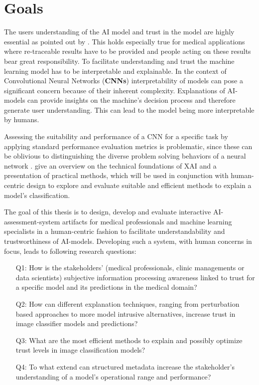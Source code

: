 \documentclass[11pt,a4paper,english]{scrreprt}
\begin{document}
\section{Goals}
The users understanding of the AI model and trust in the model are highly essential as pointed out by \textcite{knapic_explainable_2021}. This holds especially true for medical applications where re-traceable results have to be provided and people acting on these results bear great responsibility. To facilitate understanding and trust the machine learning model has to be interpretable and explainable. In the context of Convolutional Neural Networks (\textbf{CNNs}) interpretability of models can pose a significant concern because of their inherent complexity. Explanations of AI-models can provide insights on the machine's decision process and therefore generate user understanding. This can lead to the model being more interpretable by humans.

Assessing the suitability and performance of a CNN for a specific task by applying standard performance evaluation metrics is problematic, since these can be oblivious to distinguishing the diverse problem solving behaviors of a neural network \parencite{lapuschkin_unmasking_2019}. \textcite{samek_explaining_2021,JMLR:v17:15-618,ribeiro_anchors_2018} give an overview on the technical foundations of XAI and a presentation of practical methods, which will be used in conjunction with human-centric design to explore and evaluate suitable and efficient methods to explain a model's classification.

The goal of this thesis is to design, develop and evaluate interactive AI-assessment-system artifacts for medical professionals and machine learning specialists in a human-centric fashion to facilitate understandability and trustworthiness of AI-models. Developing such a system, with human concerns in focus, leads to following research questions:
\begin{itemize}
    \item[Q1:] How is the stakeholders' (medical professionals, clinic managements or data scientists) subjective information processing awareness linked to trust for a specific model and its predictions in the medical domain?
    \item[Q2:] How can different explanation techniques, ranging from perturbation based approaches to more model intrusive alternatives, increase trust in image classifier models and predictions?
    \item[Q3:] What are the most efficient methods to explain and possibly optimize trust levels in image classification models?
    \item[Q4:] To what extend can structured metadata increase the stakeholder's understanding of a model's operational range and performance?
\end{itemize}
\end{document}

